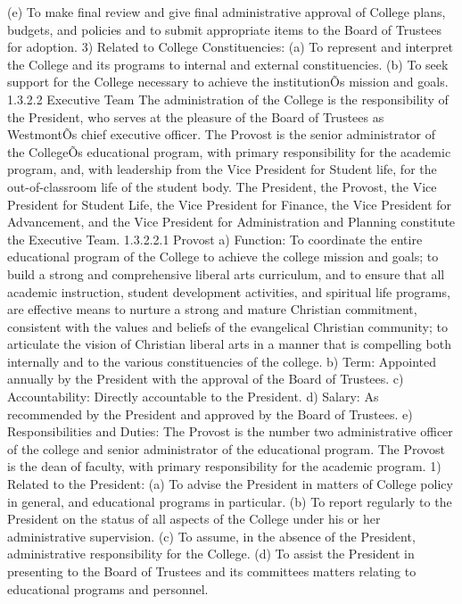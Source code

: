 \documentclass[letterpaper, 11pt]{article}
\begin{document}
(e) To make final review and give final administrative approval of College plans, budgets, and policies and to submit appropriate items to the Board of Trustees for adoption.
3) Related to College Constituencies:
(a) To represent and interpret the College and its programs to internal and external constituencies.
(b) To seek support for the College necessary to achieve the institutionÕs mission and goals.
1.3.2.2 Executive Team
   The administration of the College is the responsibility of the President, who serves at the pleasure of the Board of Trustees as WestmontÕs chief executive officer.  The Provost is the senior administrator of the CollegeÕs educational program, with primary responsibility for the academic program, and, with leadership from the Vice President for Student life, for the out-of-classroom life of the student body.  The President, the Provost, the Vice President for Student Life, the Vice President for Finance, the Vice President for Advancement, and the Vice President for Administration and Planning constitute the Executive Team.
1.3.2.2.1 Provost
a) Function:  To coordinate the entire educational program of the College to achieve the college mission and goals; to build a strong and comprehensive liberal arts curriculum, and to ensure that all academic instruction, student development activities, and spiritual life programs, are effective means to nurture a strong and mature Christian commitment, consistent with the values and beliefs of the evangelical Christian community; to articulate the vision of Christian liberal arts in a manner that is compelling both internally and to the various constituencies of the college.
b) Term:  Appointed annually by the President with the approval of the Board of Trustees.
c) Accountability:  Directly accountable to the President.
d) Salary:  As recommended by the President and approved by the Board of Trustees.
e) Responsibilities and Duties:  The Provost is the number two administrative officer of the college and senior administrator of the educational program.  The Provost is the dean of faculty, with primary responsibility for the academic program.
1) Related to the President:
(a) To advise the President in matters of College policy in general, and educational programs in particular.
(b) To report regularly to the President on the status of all aspects of the College under his or her administrative supervision.
(c) To assume, in the absence of the President, administrative responsibility for the College.
(d) To assist the President in presenting to the Board of Trustees and its committees matters relating to educational programs and personnel.
\end{document}
